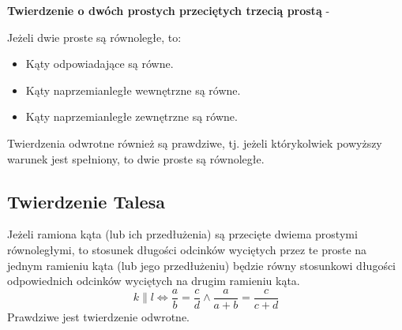 \documentclass[14pt,a4paper]{extarticle}
\begin{document}
\noindent \textbf{Twierdzenie o dwóch prostych przeciętych trzecią prostą} - 
\noindent Jeżeli dwie proste są równoległe, to:
\begin{itemize}
   \item Kąty odpowiadające są równe.
   \item Kąty naprzemianległe wewnętrzne są równe.
   \item Kąty naprzemianległe zewnętrzne są równe.
\end{itemize}
Twierdzenia odwrotne również są prawdziwe, tj. jeżeli którykolwiek powyższy warunek jest spełniony,
to dwie proste są równoległe.

\subsection{Twierdzenie Talesa}
\MoveBelowBox\unskip
{}
\noindent Jeżeli ramiona kąta (lub ich przedłużenia) są przecięte dwiema prostymi równoległymi, to stosunek
długości odcinków wyciętych przez te proste na jednym ramieniu kąta (lub jego przedłużeniu) będzie równy
stosunkowi długości odpowiednich odcinków wyciętych na drugim ramieniu kąta.
$$k\parallel l \Leftrightarrow \dfrac{a}{b} = \dfrac{c}{d} \land \dfrac{a}{a+b} = \dfrac{c}{c+d}$$
\MoveBelowBox
\noindent Prawdziwe jest twierdzenie odwrotne.
\end{document}
